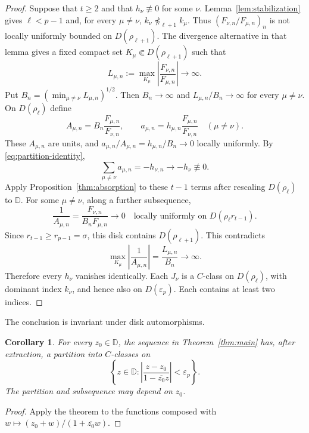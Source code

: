 \documentclass[12pt,letterpaper,reqno]{amsart}
\newtheorem{cor}[thm]{Corollary}
\theoremstyle{definition}
\numberwithin{equation}{section}
\newcommand{\D}{\mathbb D}
\begin{document}
\begin{proof}
    Suppose that $t\ge2$ and that $h_\nu\not\equiv0$ for some $\nu$.
    Lemma~\ref{lem:stabilization} gives $\ell<p-1$ and, for every
    $\mu\ne\nu$, $k_\nu\not\preceq_{\ell+1}k_\mu$.
    Thus $(F_{\nu,n}/F_{\mu,n})_n$ is not locally uniformly bounded
    on $D(\rho_{\ell+1})$. The divergence alternative in that lemma
    gives a fixed compact set $K_\mu\Subset D(\rho_{\ell+1})$ such that
    \[
        L_{\mu,n}:=\max_{K_\mu}
        \left|\frac{F_{\nu,n}}{F_{\mu,n}}\right|\longrightarrow\infty.
    \]
    Put $B_n=(\min_{\mu\ne\nu}L_{\mu,n})^{1/2}$.
    Then $B_n\to\infty$ and $L_{\mu,n}/B_n\to\infty$ for every
    $\mu\ne\nu$. On $D(\rho_\ell)$ define
    \[
        A_{\mu,n}=B_n\frac{F_{\mu,n}}{F_{\nu,n}},\qquad
        a_{\mu,n}=h_{\mu,n}\frac{F_{\mu,n}}{F_{\nu,n}}
        \quad(\mu\ne\nu).
    \]
    These $A_{\mu,n}$ are units, and
    $a_{\mu,n}/A_{\mu,n}=h_{\mu,n}/B_n\to0$ locally uniformly.
    By \eqref{eq:partition-identity},
    \[
        \sum_{\mu\ne\nu}a_{\mu,n}
        =-h_{\nu,n}\longrightarrow-h_\nu\not\equiv0.
    \]
    Apply Proposition~\ref{thm:absorption} to these $t-1$ terms
    after rescaling $D(\rho_\ell)$ to $\D$. For some $\mu\ne\nu$,
    along a further subsequence,
    \[
        \frac1{A_{\mu,n}}=\frac{F_{\nu,n}}{B_nF_{\mu,n}}
        \longrightarrow0
        \quad\text{locally uniformly on }D(\rho_\ell r_{t-1}).
    \]
    Since $r_{t-1}\ge r_{p-1}=\sigma$, this disk contains
    $D(\rho_{\ell+1})$. This contradicts
    \[
        \max_{K_\mu}\left|\frac1{A_{\mu,n}}\right|
        =\frac{L_{\mu,n}}{B_n}\longrightarrow\infty.
    \]
    Therefore every $h_\nu$ vanishes identically. Each $J_\nu$ is a
    $C$-class on $D(\rho_\ell)$, with dominant index $k_\nu$, and hence
    also on $D(\varepsilon_p)$. Each contains at least two indices.
\end{proof}
	
	The conclusion is invariant under disk automorphisms.
	
	\begin{cor}\label{cor:centers}
		For every $z_0\in\D$, the sequence in Theorem~\ref{thm:main}
		has, after extraction, a partition into $C$-classes on
		\[
		\left\{z\in\D:
		\left|\frac{z-z_0}{1-\overline{z_0}z}\right|<\varepsilon_p\right\}.
		\]
		The partition and subsequence may depend on $z_0$.
	\end{cor}
	
	\begin{proof}
		Apply the theorem to the functions composed with
		$w\mapsto(z_0+w)/(1+\overline{z_0}w)$.
	\end{proof}
	
\end{document}
